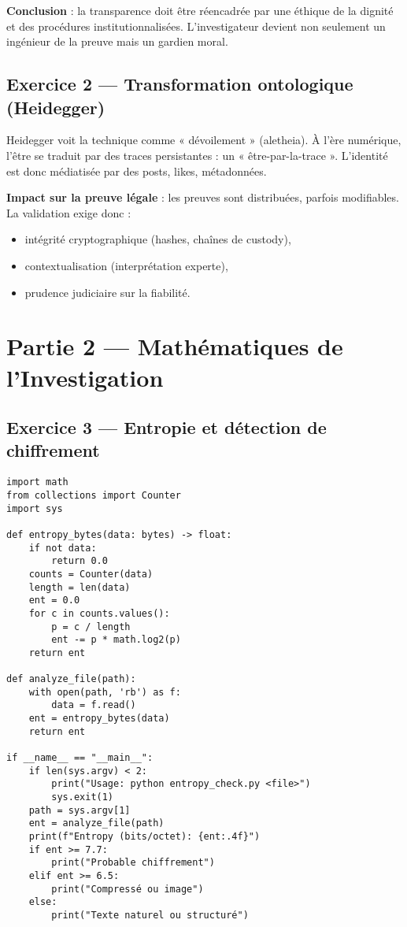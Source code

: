 \documentclass[11pt]{article}
\begin{document}
\textbf{Conclusion} : la transparence doit être réencadrée par une éthique de la dignité et des procédures institutionnalisées. L’investigateur devient non seulement un ingénieur de la preuve mais un gardien moral.

\subsection{Exercice 2 — Transformation ontologique (Heidegger)}

Heidegger voit la technique comme « dévoilement » (aletheia). À l’ère numérique, l’être se traduit par des traces persistantes : un « être-par-la-trace ». L’identité est donc médiatisée par des posts, likes, métadonnées.  

\textbf{Impact sur la preuve légale} : les preuves sont distribuées, parfois modifiables. La validation exige donc :
\begin{itemize}
  \item intégrité cryptographique (hashes, chaînes de custody),
  \item contextualisation (interprétation experte),
  \item prudence judiciaire sur la fiabilité.
\end{itemize}

\section{Partie 2 — Mathématiques de l’Investigation}

\subsection{Exercice 3 — Entropie et détection de chiffrement}

\begin{lstlisting}
import math
from collections import Counter
import sys

def entropy_bytes(data: bytes) -> float:
    if not data:
        return 0.0
    counts = Counter(data)
    length = len(data)
    ent = 0.0
    for c in counts.values():
        p = c / length
        ent -= p * math.log2(p)
    return ent

def analyze_file(path):
    with open(path, 'rb') as f:
        data = f.read()
    ent = entropy_bytes(data)
    return ent

if __name__ == "__main__":
    if len(sys.argv) < 2:
        print("Usage: python entropy_check.py <file>")
        sys.exit(1)
    path = sys.argv[1]
    ent = analyze_file(path)
    print(f"Entropy (bits/octet): {ent:.4f}")
    if ent >= 7.7:
        print("Probable chiffrement")
    elif ent >= 6.5:
        print("Compressé ou image")
    else:
        print("Texte naturel ou structuré")
\end{lstlisting}
\end{document}
